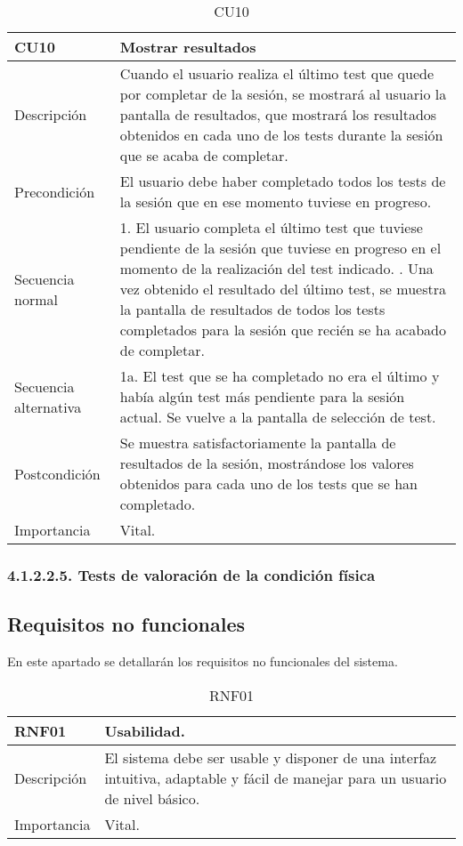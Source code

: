 \begin{table}[H]
\label{CU10}
\begin{center}
\begin{tabular}{| l | p{10cm} |}
\hline
CU10 & Mostrar resultados\\
\hline
Descripción & Cuando el usuario realiza el último test que quede por completar de la sesión, se mostrará al usuario la pantalla de resultados, que mostrará los resultados obtenidos en cada uno de los tests durante la sesión que se acaba de completar.\\
\hline
Precondición & El usuario debe haber completado todos los tests de la sesión que en ese momento tuviese en progreso.\\
\hline
Secuencia normal & 1. El usuario completa el último test que tuviese pendiente de la sesión que tuviese en progreso en el momento de la realización del test indicado.
\newline 2. Una vez obtenido el resultado del último test, se muestra la pantalla de resultados de todos los tests completados para la sesión que recién se ha acabado de completar.\\
\hline
Secuencia alternativa & 1a. El test que se ha completado no era el último y había algún test más pendiente para la sesión actual. Se vuelve a la pantalla de selección de test.\\
\hline
Postcondición & Se muestra satisfactoriamente la pantalla de resultados de la sesión, mostrándose los valores obtenidos para cada uno de los tests que se han completado.\\
\hline
Importancia & Vital.\\
\hline
\end{tabular}
\end{center}
\caption{CU10}
\end{table}

\subsubsection{4.1.2.2.5. Tests de valoración de la condición física}

\subsection{Requisitos no funcionales}

En este apartado se detallarán los requisitos no funcionales del sistema.

\begin{table}[H]
\label{RNF01}
\begin{center}
\begin{tabular}{| l | p{10cm} |}
\hline
RNF01 & Usabilidad.\\
\hline
Descripción & El sistema debe ser usable y disponer de una interfaz intuitiva, adaptable y fácil de manejar para un usuario de nivel básico.\\
\hline
Importancia & Vital.\\
\hline
\end{tabular}
\end{center}
\caption{RNF01}
\end{table} 

